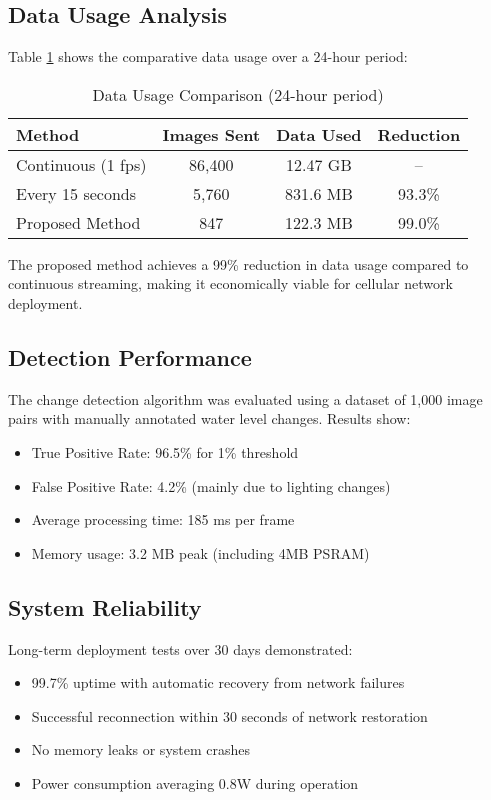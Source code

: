 \documentclass[conference]{IEEEtran}
\begin{document}
\subsection{Data Usage Analysis}

Table \ref{tab:data_usage} shows the comparative data usage over a 24-hour period:

\begin{table}[htbp]
\caption{Data Usage Comparison (24-hour period)}
\begin{center}
\begin{tabular}{|l|c|c|c|}
\hline
\textbf{Method} & \textbf{Images Sent} & \textbf{Data Used} & \textbf{Reduction} \\
\hline
Continuous (1 fps) & 86,400 & 12.47 GB & -- \\
\hline
Every 15 seconds & 5,760 & 831.6 MB & 93.3\% \\
\hline
Proposed Method & 847 & 122.3 MB & 99.0\% \\
\hline
\end{tabular}
\label{tab:data_usage}
\end{center}
\end{table}

The proposed method achieves a 99\% reduction in data usage compared to continuous streaming, making it economically viable for cellular network deployment.

\subsection{Detection Performance}

The change detection algorithm was evaluated using a dataset of 1,000 image pairs with manually annotated water level changes. Results show:
\begin{itemize}
\item True Positive Rate: 96.5\% for 1\% threshold
\item False Positive Rate: 4.2\% (mainly due to lighting changes)
\item Average processing time: 185 ms per frame
\item Memory usage: 3.2 MB peak (including 4MB PSRAM)
\end{itemize}

\subsection{System Reliability}

Long-term deployment tests over 30 days demonstrated:
\begin{itemize}
\item 99.7\% uptime with automatic recovery from network failures
\item Successful reconnection within 30 seconds of network restoration
\item No memory leaks or system crashes
\item Power consumption averaging 0.8W during operation
\end{itemize}
\end{document}
